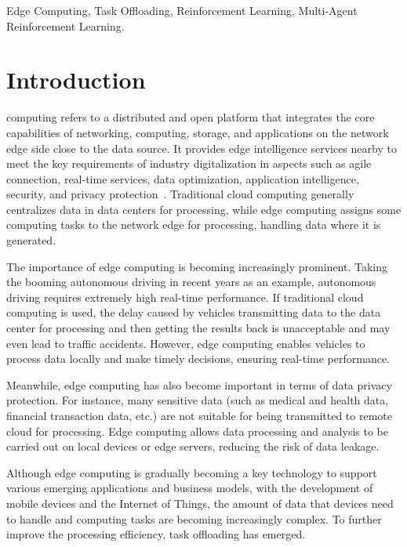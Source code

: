 \documentclass[journal]{IEEEtran}
\begin{document}
\begin{IEEEkeywords}
Edge Computing, Task Offloading, Reinforcement Learning, Multi-Agent Reinforcement Learning.
\end{IEEEkeywords}

\section{Introduction}
 computing refers to a distributed and open platform that integrates the core capabilities of networking, 
computing, storage, and applications on the network edge side close to the data source. 
It provides edge intelligence services nearby to meet the key requirements of industry digitalization in aspects such as agile connection, 
real-time services, data optimization, application intelligence, security, and privacy protection~\cite{zheng01}. 
Traditional cloud computing generally centralizes data in data centers for processing, 
while edge computing assigns some computing tasks to the network edge for processing, handling data where it is generated.

The importance of edge computing is becoming increasingly prominent. 
Taking the booming autonomous driving in recent years as an example, autonomous driving requires extremely high real-time performance. 
If traditional cloud computing is used, the delay caused by vehicles transmitting data to the data center for processing and then 
getting the results back is unacceptable and may even lead to traffic accidents. 
However, edge computing enables vehicles to process data locally and make timely decisions, ensuring real-time performance.

Meanwhile, edge computing has also become important in terms of data privacy protection. 
For instance, many sensitive data (such as medical and health data, financial transaction data, etc.) are not suitable 
for being transmitted to remote cloud for processing. 
Edge computing allows data processing and analysis to be carried out on local devices or edge servers, reducing the risk of data leakage.

Although edge computing is gradually becoming a key technology to support various emerging applications and business models, 
with the development of mobile devices and the Internet of Things, 
the amount of data that devices need to handle and computing tasks are becoming increasingly complex. 
To further improve the processing efficiency, task offloading has emerged.
\end{document}
